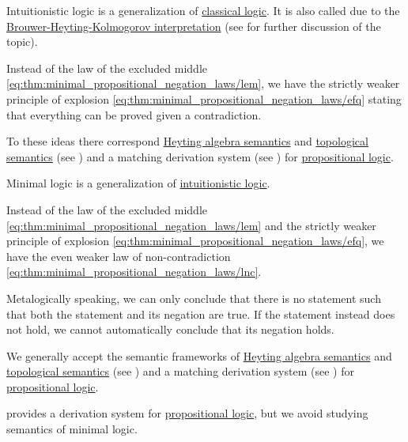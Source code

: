 \begin{definition}\label{def:intuitionistic_logic}
  Intuitionistic logic is a generalization of \hyperref[def:classical_logic]{classical logic}. It is also called  due to the \hyperref[def:brouwer_heyting_kolmogorov_interpretation]{Brouwer-Heyting-Kolmogorov interpretation} (see  for further discussion of the topic).

  Instead of the law of the excluded middle \eqref{eq:thm:minimal_propositional_negation_laws/lem}, we have the strictly weaker principle of explosion \eqref{eq:thm:minimal_propositional_negation_laws/efq} stating that everything can be proved given a contradiction.

  To these ideas there correspond \hyperref[def:propositional_heyting_algebra_semantics]{Heyting algebra semantics} and \hyperref[def:propositional_topological_semantics]{topological semantics} (see ) and a matching derivation system (see ) for \hyperref[subsec:propositional_logic]{propositional logic}.
\end{definition}

\begin{definition}\label{def:minimal_logic}
  Minimal logic is a generalization of \hyperref[def:intuitionistic_logic]{intuitionistic logic}.

  Instead of the law of the excluded middle \eqref{eq:thm:minimal_propositional_negation_laws/lem} and the strictly weaker principle of explosion \eqref{eq:thm:minimal_propositional_negation_laws/efq}, we have the even weaker law of non-contradiction \eqref{eq:thm:minimal_propositional_negation_laws/lnc}.

  Metalogically speaking, we can only conclude that there is no statement such that both the statement and its negation are true. If the statement instead does not hold, we cannot automatically conclude that its negation holds.

  We generally accept the semantic frameworks of \hyperref[def:propositional_heyting_algebra_semantics]{Heyting algebra semantics} and \hyperref[def:propositional_topological_semantics]{topological semantics} (see ) and a matching derivation system (see ) for \hyperref[subsec:propositional_logic]{propositional logic}.

   provides a derivation system for \hyperref[subsec:propositional_logic]{propositional logic}, but we avoid studying semantics of minimal logic.
\end{definition}


